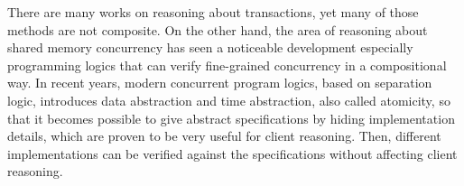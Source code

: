 There are many works on reasoning about transactions, yet many of those methods are not composite. On the other hand, the area of reasoning about shared memory concurrency has seen a noticeable development especially programming logics that can verify fine-grained concurrency in a compositional way. In recent years, modern concurrent program logics, based on separation logic, introduces data abstraction and time abstraction, also called atomicity, so that it becomes possible to give abstract specifications by hiding implementation details, which are proven to be very useful for client reasoning. Then, different implementations can be verified against the specifications without affecting client reasoning.

